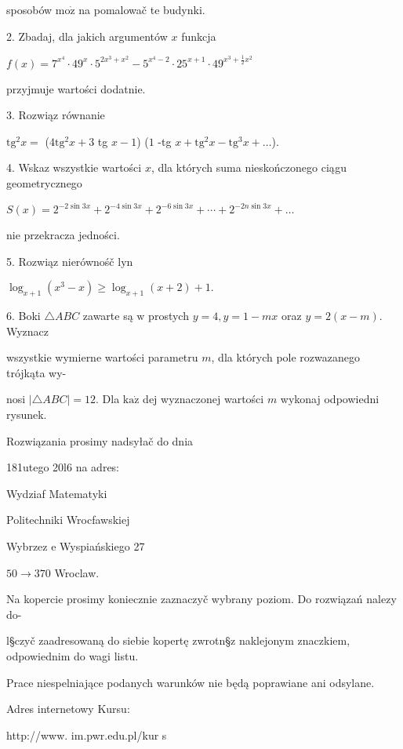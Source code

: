 \documentclass[a4paper,12pt]{article}
\begin{document}
sposobów $\mathrm{m}\mathrm{o}\dot{\mathrm{z}}$ na pomalowač te budynki.

2. Zbadaj, dla jakich argumentów $x$ funkcja

$f(x)=7^{x^{4}}\cdot 49^{x}\cdot 5^{2x^{3}+x^{2}}-5^{x^{4}-2}\cdot 25^{x+1}\cdot 49^{x^{3}+\frac{1}{2}x^{2}}$

przyjmuje wartości dodatnie.

3. Rozwiąz równanie

$\mathrm{t}\mathrm{g}^{2}x=$ ($4\mathrm{t}\mathrm{g}^{2}x+3$ tg $x-1$) ($1$ -tg $ x+\mathrm{t}\mathrm{g}^{2}x-\mathrm{t}\mathrm{g}^{3}x+\ldots$).

4. Wskaz wszystkie wartości $x$, dla których suma nieskończonego ciągu geometrycznego

$ S(x)=2^{-2\sin 3x}+2^{-4\sin 3x}+2^{-6\sin 3x}+\cdots+2^{-2n\sin 3x}+\ldots$

nie przekracza jedności.

5. Rozwiąz nierównośč $\mathrm{l}\mathrm{y}\mathrm{n}$

$\log_{x+1}(x^{3}-x)\geq\log_{x+1}(x+2)+1.$

6. Boki $\triangle ABC$ zawarte są $\mathrm{w}$ prostych $y=4, y= 1-mx$ oraz $y=2(x-m)$. Wyznacz

wszystkie wymierne wartości parametru $m$, dla których pole rozwazanego trójkąta wy-

nosi $|\triangle ABC|=12$. Dla $\mathrm{k}\mathrm{a}\dot{\mathrm{z}}$ dej wyznaczonej wartości $m$ wykonaj odpowiedni rysunek.

Rozwiązania prosimy nadsyłač do dnia

181utego 20l6 na adres:

Wydziaf Matematyki

Politechniki Wrocfawskiej

Wybrzez $\mathrm{e}$ Wyspiańskiego 27

$50\rightarrow 370$ Wroclaw.

Na kopercie prosimy koniecznie zaznaczyč wybrany poziom. Do rozwiązań nalezy do-

l\S czyč zaadresowaną do siebie kopertę zwrotn\S z naklejonym znaczkiem, odpowiednim do wagi listu.

Prace niespelniające podanych warunków nie będą poprawiane ani odsylane.

Adres internetowy Kursu:

http://www. im.pwr.edu.pl/kur s
\end{document}
